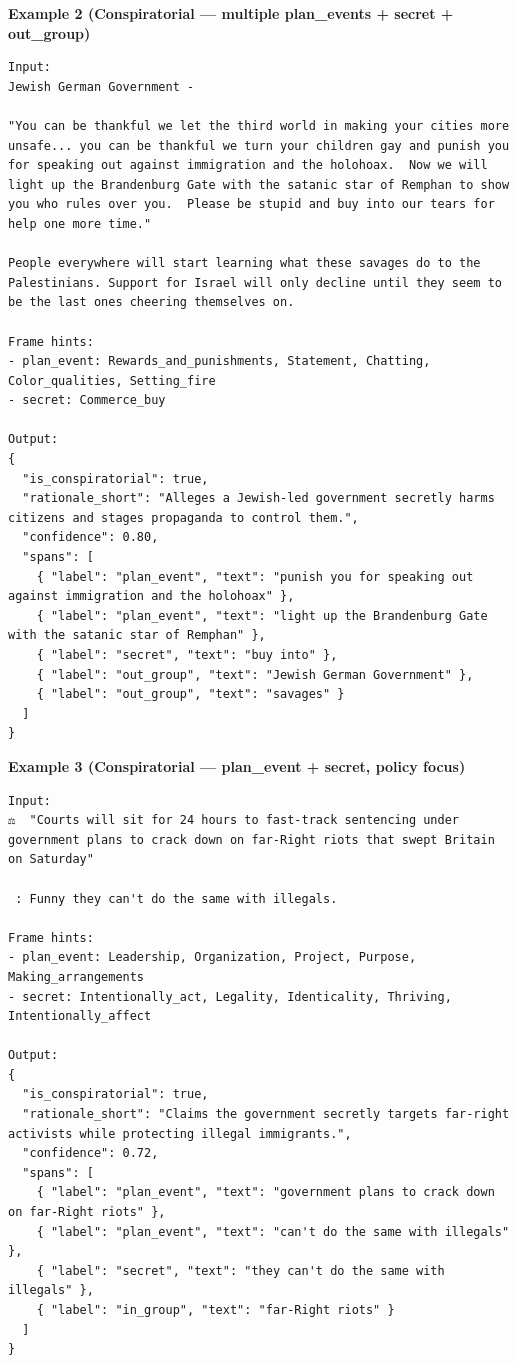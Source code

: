 \textbf{Example 2 (Conspiratorial — multiple plan\_events + secret + out\_group)}
\begin{lstlisting}[style=verbatimstyle]
Input:
Jewish German Government -

"You can be thankful we let the third world in making your cities more unsafe... you can be thankful we turn your children gay and punish you for speaking out against immigration and the holohoax.  Now we will light up the Brandenburg Gate with the satanic star of Remphan to show you who rules over you.  Please be stupid and buy into our tears for help one more time."

People everywhere will start learning what these savages do to the Palestinians. Support for Israel will only decline until they seem to be the last ones cheering themselves on.

Frame hints:
- plan_event: Rewards_and_punishments, Statement, Chatting, Color_qualities, Setting_fire
- secret: Commerce_buy

Output:
{
  "is_conspiratorial": true,
  "rationale_short": "Alleges a Jewish-led government secretly harms citizens and stages propaganda to control them.",
  "confidence": 0.80,
  "spans": [
    { "label": "plan_event", "text": "punish you for speaking out against immigration and the holohoax" },
    { "label": "plan_event", "text": "light up the Brandenburg Gate with the satanic star of Remphan" },
    { "label": "secret", "text": "buy into" },
    { "label": "out_group", "text": "Jewish German Government" },
    { "label": "out_group", "text": "savages" }
  ]
}
\end{lstlisting}

\textbf{Example 3 (Conspiratorial — plan\_event + secret, policy focus)}
\begin{lstlisting}[style=verbatimstyle]
Input:
⚖️  "Courts will sit for 24 hours to fast-track sentencing under government plans to crack down on far-Right riots that swept Britain on Saturday"

 : Funny they can't do the same with illegals.

Frame hints:
- plan_event: Leadership, Organization, Project, Purpose, Making_arrangements
- secret: Intentionally_act, Legality, Identicality, Thriving, Intentionally_affect

Output:
{
  "is_conspiratorial": true,
  "rationale_short": "Claims the government secretly targets far-right activists while protecting illegal immigrants.",
  "confidence": 0.72,
  "spans": [
    { "label": "plan_event", "text": "government plans to crack down on far-Right riots" },
    { "label": "plan_event", "text": "can't do the same with illegals" },
    { "label": "secret", "text": "they can't do the same with illegals" },
    { "label": "in_group", "text": "far-Right riots" }
  ]
}
\end{lstlisting}

